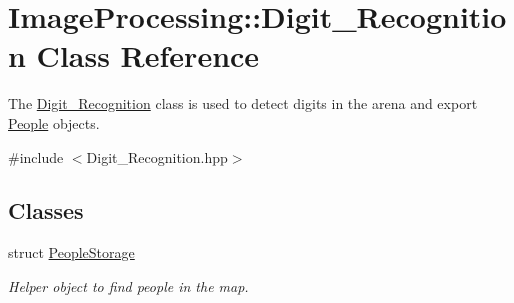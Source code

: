 \hypertarget{class_image_processing_1_1_digit___recognition}{}\section{Image\+Processing\+:\+:Digit\+\_\+\+Recognition Class Reference}
\label{class_image_processing_1_1_digit___recognition}


The \mbox{\hyperlink{class_image_processing_1_1_digit___recognition}{Digit\+\_\+\+Recognition}} class is used to detect digits in the arena and export \mbox{\hyperlink{class_people}{People}} objects.  




{\ttfamily \#include $<$Digit\+\_\+\+Recognition.\+hpp$>$}

\subsection*{Classes}
\begin{DoxyCompactItemize}
\item 
struct \mbox{\hyperlink{struct_image_processing_1_1_digit___recognition_1_1_people_storage}{People\+Storage}}
\begin{DoxyCompactList}\small\item\em Helper object to find people in the map. \end{DoxyCompactList}\end{DoxyCompactItemize}

